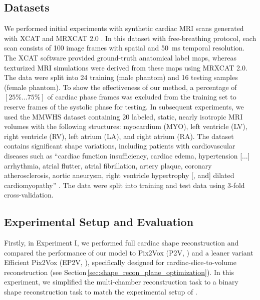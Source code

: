     \subsection{Datasets}
     We performed initial experiments with synthetic cardiac MRI scans generated with XCAT \citep{segars20104d} and MRXCAT 2.0 \citep{buoso2023mrxcat2}.
    In this dataset with free-breathing protocol, each scan consists of 100 image frames with  spatial and \SI{50}{\milli\second} temporal resolution.
    The XCAT software provided ground-truth anatomical label maps, whereas texturized MRI simulations were derived from these maps using MRXCAT 2.0.
    The data were split into 24 training (male phantom) and 16 testing samples (female phantom). To show the effectiveness of our method,
    a percentage of $\left[25\% ... 75\%\right]$ of cardiac phase frames was excluded from the training set to reserve frames of the systolic phase for testing.
    In subsequent experiments, we used the MMWHS dataset \citep{zhuang2016multi} containing 20 labeled, static, nearly isotropic MRI volumes with the following structures: myocardium (MYO), left ventricle (LV), right ventricle (RV), left atrium (LA), and right atrium (RA). The dataset contains significant shape variations, including patients with cardiovascular diseases such as ``cardiac function insufficiency, cardiac edema, hypertension [...] arrhythmia, atrial flutter, atrial fibrillation, artery plaque, coronary atherosclerosis, aortic aneurysm, right ventricle hypertrophy [, and] dilated cardiomyopathy'' \citep{zhuang2016multi}.
    The data were split into training and test data using 3-fold cross-validation.

    \subsection{Experimental Setup and Evaluation}
    \label{sec:experiments}
    Firstly, in Experiment I, we performed full cardiac shape reconstruction and compared the performance of our model to Pix2Vox (P2V, \citep{xie2019pix2vox}) and a leaner variant Efficient Pix2Vox (EP2V, \citep{stojanovski2022efficient}), specifically designed for cardiac-slice-to-volume reconstruction (see Section\,\ref{sec:shape_recon_plane_optimization}).
    In this experiment, we simplified the multi-chamber reconstruction task to a binary shape reconstruction task to match the experimental setup of \citep{stojanovski2022efficient}.

